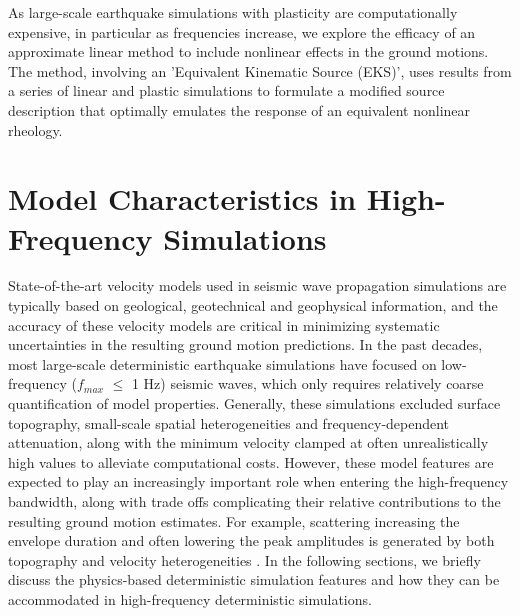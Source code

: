  As large-scale earthquake simulations with plasticity are computationally expensive, in particular as frequencies increase, we explore the efficacy of an approximate linear method to include nonlinear effects in the ground motions. The method, involving an 'Equivalent Kinematic Source (EKS)', uses results from a series of linear and plastic simulations to formulate a modified source description that optimally emulates the response of an equivalent nonlinear rheology.



\section{Model Characteristics in High-Frequency Simulations}

State-of-the-art velocity models used in seismic wave propagation simulations are typically based on geological, geotechnical and geophysical information, and the accuracy of these velocity models are critical in minimizing systematic uncertainties in the resulting ground motion predictions. In the past decades, most large-scale deterministic earthquake simulations have focused on low-frequency ($f_{max}$ $\leqslant$ 1 Hz) seismic waves, which only requires relatively coarse quantification of model properties. Generally, these simulations excluded surface topography, small-scale spatial heterogeneities and frequency-dependent attenuation, along with the minimum velocity clamped at often unrealistically high values to alleviate computational costs. However, these model features are expected to play an increasingly important role when entering the high-frequency bandwidth, along with trade offs complicating their relative contributions to the resulting ground motion estimates. For example, scattering increasing the envelope duration and often lowering the peak amplitudes is generated by both topography and velocity heterogeneities \citet{laiShallowBasinStructure2020}.
In the following sections, we briefly discuss the physics-based deterministic simulation features and how they can be accommodated in high-frequency deterministic simulations.


